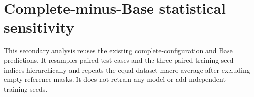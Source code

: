 \documentclass[pdflatex,sn-vancouver-num,referee,lineno]{sn-jnl}
\begin{document}

\FloatBarrier

\section*{Complete-minus-Base statistical sensitivity}
This secondary analysis reuses the existing complete-configuration and Base
predictions. It resamples paired test cases and the three paired training-seed
indices hierarchically and repeats the equal-dataset macro-average after
excluding empty reference masks. It does not retrain any model or add independent
training seeds.


\FloatBarrier
\end{document}
